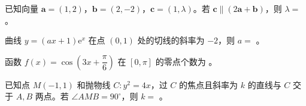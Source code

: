 \begin{question}
已知向量 $\boldsymbol a = (1, 2)$，$\boldsymbol b = (2, -2)$，$\boldsymbol c = (1, \lambda)$。若 $\boldsymbol c \parallel (2\boldsymbol a + \boldsymbol b)$，则 $\lambda =$ \underline{\hspace{2cm}}。

\end{question}
\begin{question}
曲线 $y = (ax + 1)\mathrm e^x$ 在点 $(0, 1)$ 处的切线的斜率为 $-2$，则 $a =$ \underline{\hspace{2cm}}。

\end{question}
\begin{question}
函数 $f(x) = \cos\left(3x + \dfrac\pi6\right)$ 在 $[0, \pi]$ 的零点个数为 \underline{\hspace{2cm}}。

\end{question}
\begin{question}
已知点 $M(-1, 1)$ 和抛物线 $C: y^2 = 4x$，过 $C$ 的焦点且斜率为 $k$ 的直线与 $C$ 交于 $A, B$ 两点。若 $\angle AMB = 90^\circ$，则 $k =$ \underline{\hspace{2cm}}。

\par\medskip

\end{question}


